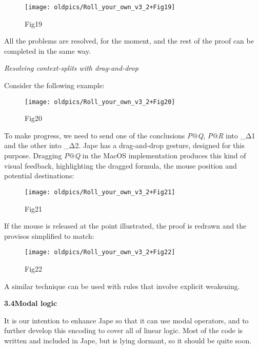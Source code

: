\documentclass[11pt]{book}
\newcommand{\tab}{\hspace{5mm}}
\begin{document}
\begin{figure}[htbp]
\begin{center}
\texttt{[image: oldpics/Roll\_your\_own\_v3\_2+Fig19]}
\caption{Fig19}
\end{center}
\end{figure}


All the problems are resolved, for the moment, and the rest of the proof can be completed in the same way.


\textit{Resolving context-splits with drag-and-drop}


Consider the following example:

\begin{figure}[htbp]
\begin{center}
\texttt{[image: oldpics/Roll\_your\_own\_v3\_2+Fig20]}
\caption{Fig20}
\end{center}
\end{figure}


To make progress, we need to send one of the conclusions \textit{P}\ensuremath{@}\textit{Q}, \textit{P}\ensuremath{@}\textit{R} into \_Δ1 and the other into \_Δ2. Jape has a drag-and-drop gesture, designed for this purpose. Dragging \textit{P}\ensuremath{@}\textit{Q} in the MacOS implementation produces this kind of visual feedback, highlighting the dragged formula, the mouse position and potential destinations:

\begin{figure}[htbp]
\begin{center}
\texttt{[image: oldpics/Roll\_your\_own\_v3\_2+Fig21]}
\caption{Fig21}
\end{center}
\end{figure}


If the mouse is released at the point illustrated, the proof is redrawn and the provisos simplified to match:

\begin{figure}[htbp]
\begin{center}
\texttt{[image: oldpics/Roll\_your\_own\_v3\_2+Fig22]}
\caption{Fig22}
\end{center}
\end{figure}


A similar technique can be used with rules that involve explicit weakening.


\textbf{{\large 3.4\tab Modal logic}}


It is our intention to enhance Jape so that it can use modal operators, and to further develop this encoding to cover all of linear logic. Most of the code is written and included in Jape, but is lying dormant, so it should be quite soon.
\end{document}
